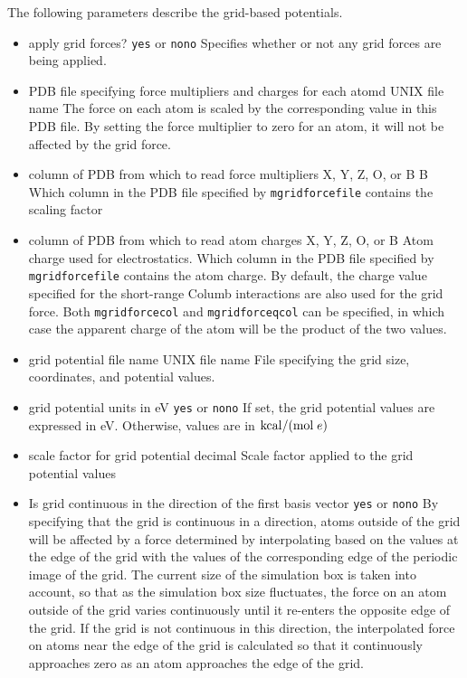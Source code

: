 The following parameters describe the grid-based potentials.

\begin{itemize}

\item
{}
{apply grid forces?}
{{\tt yes} or {\tt no}}{{\tt no}}
{Specifies whether or not any grid forces are being applied.}

\item
{}
{PDB file specifying force multipliers and charges for each atomd}
{UNIX file name}
{The force on each atom is scaled by the corresponding value in this PDB file. By setting the force multiplier to zero for an atom, it will not be affected by the grid force. }

\item
{}
{column of PDB from which to read force multipliers}
{X, Y, Z, O, or B}
{B}
{Which column in the PDB file specified by {\tt mgridforcefile} contains the scaling factor}

\item
{}
{column of PDB from which to read atom charges}
{X, Y, Z, O, or B}
{Atom charge used for electrostatics.} 
{Which column in the PDB file specified by {\tt mgridforcefile} contains the atom charge. By default, the charge value specified for the short-range Columb interactions are also used for the grid force. Both {\tt mgridforcecol} and {\tt mgridforceqcol} can be specified, in which case the apparent charge of the atom will be the product of the two values.}

\item
{}
{grid potential file name}
{UNIX file name}
{File specifying the grid size, coordinates, and potential values.}

\item
{}
{grid potential units in eV}
{{\tt yes} or {\tt no}}{{\tt no}}
{If set, the grid potential values are expressed in {\rm eV}. Otherwise, values are
in ${\rm kcal} / ({\rm mol} \; e)$}

\item
{}
{scale factor for grid potential}
{decimal}
{Scale factor applied to the grid potential values}

\item
{}
{Is grid continuous in the direction of the first basis vector}
{{\tt yes} or {\tt no}}{{\tt no}}
{By specifying that the grid is continuous in a direction, atoms outside of the grid will be affected by a force determined by interpolating based on the values at the edge of the grid with the values of the corresponding edge of the periodic image of the grid. The current size of the simulation box is taken into account, so that as the simulation box size fluctuates, the force on an atom outside of the grid varies continuously until it re-enters the opposite edge of the grid. If the grid is not continuous in this direction, the interpolated force on atoms near the edge of the grid is calculated so that it continuously approaches zero as an atom approaches the edge of the grid.}


\end{itemize}
